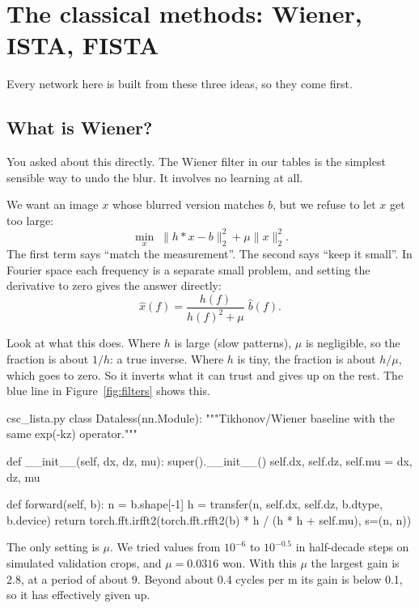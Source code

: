 \chapter{The classical methods: Wiener, ISTA, FISTA}\label{ch:classics}

Every network here is built from these three ideas, so they come first.

\section{What is Wiener?}

You asked about this directly. The Wiener filter in our tables is the simplest sensible way to undo
the blur. It involves no learning at all.

We want an image $x$ whose blurred version matches $b$, but we refuse to let $x$ get too large:
\begin{equation}
\min_x\; \lVert h * x - b \rVert_2^2 + \mu \lVert x \rVert_2^2 .
\end{equation}
The first term says ``match the measurement''. The second says ``keep it small''. In Fourier space
each frequency is a separate small problem, and setting the derivative to zero gives the answer directly:
\begin{equation}
\widehat{x}(f) = \frac{h(f)}{h(f)^2 + \mu}\; \widehat{b}(f).
\end{equation}

Look at what this does. Where $h$ is large (slow patterns), $\mu$ is negligible, so the fraction is
about $1/h$: a true inverse. Where $h$ is tiny, the fraction is about $h/\mu$, which goes to zero.
So it inverts what it can trust and gives up on the rest. The blue line in
Figure~\ref{fig:filters} shows this.

\begin{code*}{csc_lista.py}
class Dataless(nn.Module):
    """Tikhonov/Wiener baseline with the same exp(-kz) operator."""

    def __init__(self, dx, dz, mu):
        super().__init__()
        self.dx, self.dz, self.mu = dx, dz, mu

    def forward(self, b):
        n = b.shape[-1]
        h = transfer(n, self.dx, self.dz, b.dtype, b.device)
        return torch.fft.irfft2(torch.fft.rfft2(b) * h / (h * h + self.mu), s=(n, n))
\end{code*}

The only setting is $\mu$. We tried values from $10^{-6}$ to $10^{-0.5}$ in half-decade steps on
simulated validation crops, and $\mu=0.0316$ won. With this $\mu$ the largest gain is 2.8, at a
period of about 9\um. Beyond about 0.4 cycles per \textmu m its gain is below 0.1, so it has effectively given up.

